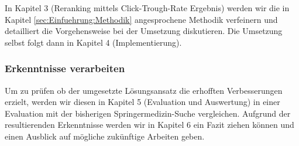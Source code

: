 In Kapitel 3 (Reranking mittels Click-Trough-Rate Ergebnis) werden wir die in Kapitel \ref{sec:Einfuehrung:Methodik} angesprochene Methodik verfeinern und detailliert die Vorgehensweise bei der Umsetzung diskutieren. Die Umsetzung selbst folgt dann in Kapitel 4 (Implementierung).

\subsubsection{Erkenntnisse verarbeiten}
\label{sec:Einfuehrung:GliederungAufbau:Erkenntnisse}

Um zu prüfen ob der umgesetzte Lösungsansatz die erhofften Verbesserungen erzielt, werden wir diesen in Kapitel 5 (Evaluation und Auswertung) in einer Evaluation mit der bisherigen Springermedizin-Suche vergleichen. Aufgrund der resultierenden Erkenntnisse werden wir in Kapitel 6 ein Fazit ziehen können und einen Ausblick auf mögliche zukünftige Arbeiten geben.